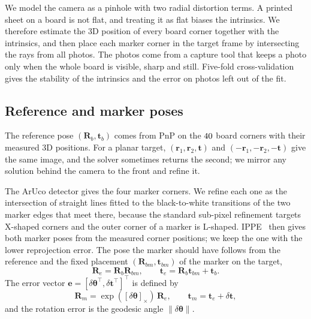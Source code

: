 \documentclass[conference]{IEEEtran}
\newcommand{\vect}[1]{\mathbf{#1}}
\begin{document}
We model the camera as a pinhole with two radial distortion terms. A printed sheet on a board is not
flat, and treating it as flat biases the intrinsics. We therefore estimate the 3D position of every
board corner together with the intrinsics, and then place each marker corner in the target frame by
intersecting the rays from all photos. The photos come from a capture tool that keeps a photo only
when the whole board is visible, sharp and still. Five-fold cross-validation gives the stability of
the intrinsics and the error on photos left out of the fit.

\subsection{Reference and marker poses}
The reference pose $(\vect{R}_b,\vect{t}_b)$ comes from PnP on the $40$ board corners with
their measured 3D positions. For a planar target, $(\vect{r}_1,\vect{r}_2,\vect{t})$ and
$(-\vect{r}_1,-\vect{r}_2,-\vect{t})$ give the same image, and the solver sometimes returns the second;
we mirror any solution behind the camera to the front and refine it.

The ArUco detector gives the four marker corners. We refine each one as the intersection of straight
lines fitted to the black-to-white transitions of the two marker edges that meet there, because the
standard sub-pixel refinement targets X-shaped corners and the outer corner of a marker is L-shaped.
IPPE~\cite{collins2014} then gives both marker poses from the measured corner positions; we keep the
one with the lower reprojection error. The pose the marker should have follows from the reference and
the fixed placement $(\vect{R}_{bm},\vect{t}_{bm})$ of the marker on the target,
\begin{equation}
\vect{R}_e = \vect{R}_b\vect{R}_{bm}, \qquad \vect{t}_e = \vect{R}_b\vect{t}_{bm} + \vect{t}_b .
\end{equation}
The error vector $\vect{e} = [\delta\boldsymbol{\theta}^\top, \delta\vect{t}^\top]^\top$ is defined by
\begin{equation}
\vect{R}_m = \exp([\delta\boldsymbol{\theta}]_\times)\,\vect{R}_e, \qquad \vect{t}_m = \vect{t}_e + \delta\vect{t},
\end{equation}
and the rotation error is the geodesic angle $\|\delta\boldsymbol{\theta}\|$.
\end{document}
